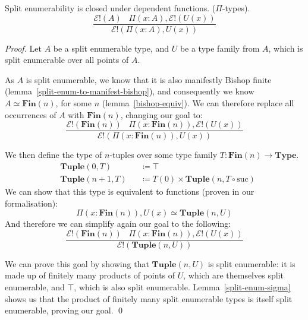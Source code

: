 \begin{lemma}
  Split enumerability is closed under dependent functions.
  (\(\Pi\)-types).
  \begin{equation}
    \frac{
      \mathcal{E}!(A) \; \; \; \Pi {(x : A)} , \mathcal{E}!\left( U(x) \right)
    }{
      \mathcal{E}!\left(\Pi {(x : A)} , U(x)\right)
    }
  \end{equation}
\end{lemma}
\begin{proof}
  Let \(A\) be a split enumerable type, and \(U\) be a type family from \(A\),
  which is split enumerable over all points of \(A\).

  As \(A\) is split enumerable, we know that it is also manifestly Bishop finite
  (lemma~\ref{split-enum-to-manifest-bishop}), and consequently we know \(A
  \simeq \mathbf{Fin}(n)\), for some \(n\) (lemma~\ref{bishop-equiv}).
  We can therefore replace all occurrences of \(A\) with \(\mathbf{Fin}(n)\),
  changing our goal to:
  \begin{equation}
    \frac{
      \mathcal{E}!(\mathbf{Fin}(n)) \; \; \; \Pi (x : \mathbf{Fin}(n)) , \mathcal{E}!\left( U(x) \right)
    }{
      \mathcal{E}!\left(\Pi (x : \mathbf{Fin}(n)) , U(x)\right)
    }
  \end{equation}
  
  We then define the type of \(n\)-tuples over some type family \(T :
  \mathbf{Fin}(n) \rightarrow \mathbf{Type}\).
  \begin{equation}
    \begin{alignat}{3}
      & \mathbf{Tuple}(0, T)   &&\coloneqq \top \\
      & \mathbf{Tuple}(n+1, T) &&\coloneqq T(0) \times \mathbf{Tuple}(n, T \circ \text{suc})
    \end{alignat}
  \end{equation}
  We can show that this type is equivalent to functions (proven in our formalisation):
  \begin{equation}
    \Pi(x : \mathbf{Fin}(n)) , U(x) \simeq \mathbf{Tuple}(n, U)
  \end{equation}
  And therefore we can simplify again our goal to the following:
  \begin{equation}
    \frac{
      \mathcal{E}!(\mathbf{Fin}(n)) \; \; \; \Pi (x : \mathbf{Fin}(n)) , \mathcal{E}!\left( U(x) \right)
    }{
      \mathcal{E}!\left(\mathbf{Tuple}(n, U)\right)
    }
  \end{equation}
  
  We can prove this goal by showing that \(\mathbf{Tuple}(n, U)\) is split
  enumerable: it is made up of finitely many products of points of \(U\), which
  are themselves split enumerable, and \(\top\), which is also split enumerable.
  Lemma~\ref{split-enum-sigma} shows us that the product of finitely many split
  enumerable types is itself split enumerable, proving our goal.
  \qed
\end{proof}


